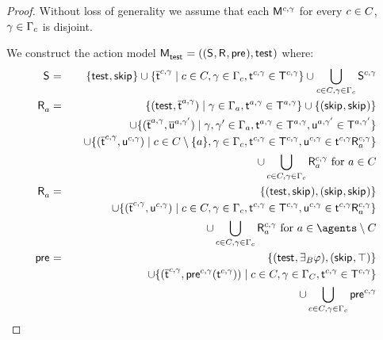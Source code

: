 \begin{proof}
Without loss of generality we assume that each $\aModel[\agentC, \gamma]$ for every $\agentC \in \agentsC$, $\gamma \in \Gamma_\agentC$ is disjoint.

We construct the action model $\aPModelAndTuple{\aStateTest}$ where:
\begin{eqnarray*}
    \aStates &=& \{\aStateTest, \aStateSkip\} \cup \{\aPStateT[\agentC, \gamma] \mid \agentC \in \agentsC, \gamma \in \Gamma_\agentC, \aStateT[\agentC, \gamma] \in \aStatesT[\agentC, \gamma]\} \cup \bigcup_{\agentC \in \agentsC, \gamma \in \Gamma_\agentC} \aStates[\agentC, \gamma]\\
    \aAccessibilityA &=& \{(\aStateTest, \aPStateT[\agentA, \gamma]) \mid \gamma \in \Gamma_\agentA, \aStateT[\agentA, \gamma] \in \aStatesT[\agentA, \gamma]\} \cup \{(\aStateSkip, \aStateSkip)\} \\&&\quad \cup \{(\aPStateT[\agentA, \gamma], \aPStateU[\agentA, \gamma']) \mid \gamma, \gamma' \in \Gamma_\agentA, \aStateT[\agentA, \gamma] \in \aStatesT[\agentA, \gamma], \aStateU[\agentA, \gamma'] \in \aStatesT[\agentA, \gamma']\} \\&& \quad \cup \{(\aPStateT[\agentC, \gamma], \aStateU[\agentC, \gamma]) \mid \agentC \in \agentsC \setminus \{\agentA\}, \gamma \in \Gamma_\agentC, \aStateT[\agentC, \gamma] \in \aStatesT[\agentC, \gamma], \aStateU[\agentC, \gamma] \in \aSuccessorsA[\agentC, \gamma]{\aStateT[\agentC, \gamma]}\}  \\&& \quad \cup \bigcup_{\agentC \in \agentsC, \gamma \in \Gamma_\agentC} \aAccessibilityA[\agentC, \gamma] \text{ for } \agentA \in \agentsC\\
    \aAccessibilityA &=& \{(\aStateTest, \aStateSkip), (\aStateSkip, \aStateSkip)\} \\&& \quad \cup \{(\aPStateT[\agentC, \gamma], \aStateU[\agentC, \gamma]) \mid \agentC \in \agentsC, \gamma \in \Gamma_\agentC, \aStateT[\agentC, \gamma] \in \aStatesT[\agentC, \gamma], \aStateU[\agentC, \gamma] \in \aSuccessorsA[\agentC, \gamma]{\aStateT[\agentC, \gamma]}\} \\&&\quad \cup \bigcup_{\agentC \in \agentsC, \gamma \in \Gamma_\agentC} \aAccessibilityA[\agentC, \gamma] \text{ for } \agentA \in \agents \setminus \agentsC\\
    \aPrecondition &=& \{(\aStateTest, \someactsBs \phi), (\aStateSkip, \top)\} \\&&\quad \cup \{(\aPStateT[\agentC, \gamma], \aPrecondition[\agentC, \gamma](\aStateT[\agentC, \gamma])) \mid \agentC \in \agentsC, \gamma \in \Gamma_\agentsC, \aStateT[\agentC, \gamma] \in \aStatesT[\agentC, \gamma]\} \\&&\quad \cup \bigcup_{\agentC \in \agentsC, \gamma \in \Gamma_\agentC} \aPrecondition[\agentC, \gamma]
\end{eqnarray*}


\end{proof}
